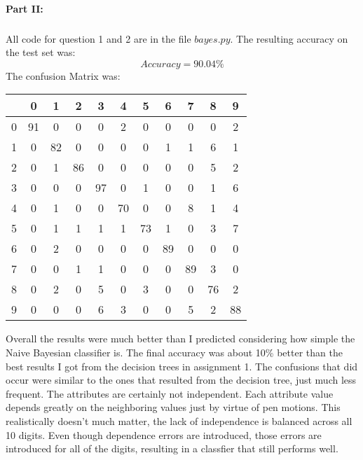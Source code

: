 \documentclass[11pt]{article}
\begin{document}
\paragraph{Part II:}
\subparagraph{} All code for question 1 and 2 are in the file $bayes.py$.  The resulting accuracy on the test set was:
\[Accuracy = 90.04\%\]
The confusion Matrix was:
\begin{center}
\begin{tabular}{|c|cccccccccc|}
  \hline
  &0&1&2&3&4&5&6&7&8&9 \\ \hline
  0&91&0&0&0&2&0&0&0&0&2 \\
  1&0&82&0&0&0&0&1&1&6&1 \\
  2&0&1&86&0&0&0&0&0&5&2 \\
  3&0&0&0&97&0&1&0&0&1&6 \\
  4&0&1&0&0&70&0&0&8&1&4 \\
  5&0&1&1&1&1&73&1&0&3&7 \\
  6&0&2&0&0&0&0&89&0&0&0 \\
  7&0&0&1&1&0&0&0&89&3&0 \\
  8&0&2&0&5&0&3&0&0&76&2 \\
  9&0&0&0&6&3&0&0&5&2&88 \\
  \hline
\end{tabular}
\end{center}
Overall the results were much better than I predicted considering how simple the Naive Bayesian classifier is.  The final accuracy was about 10\% better than the best results I got from the decision trees in assignment 1.  The confusions that did occur were similar to the ones that resulted from the decision tree, just much less frequent.  The attributes are certainly not independent.  Each attribute value depends greatly on the neighboring values just by virtue of pen motions.  This realistically doesn't much matter, the lack of independence is balanced across all 10 digits.  Even though dependence errors are introduced, those errors are introduced for all of the digits, resulting in a classfier that still performs well.
\end{document}
